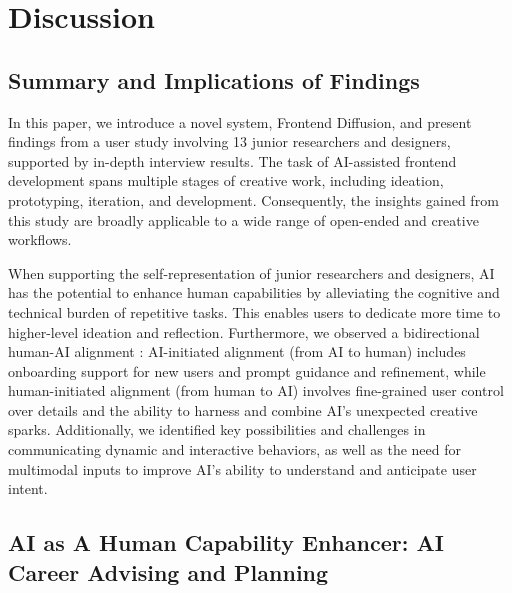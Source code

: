 \section{Discussion}

\subsection{Summary and Implications of Findings}

In this paper, we introduce a novel system, Frontend Diffusion, and present findings from a user study involving 13 junior researchers and designers, supported by in-depth interview results. The task of AI-assisted frontend development spans multiple stages of creative work, including ideation, prototyping, iteration, and development. Consequently, the insights gained from this study are broadly applicable to a wide range of open-ended and creative workflows.

When supporting the self-representation of junior researchers and designers, AI has the potential to enhance human capabilities by alleviating the cognitive and technical burden of repetitive tasks. This enables users to dedicate more time to higher-level ideation and reflection. Furthermore, we observed a bidirectional human-AI alignment \cite{shenBidirectionalHumanAIAlignment2024}: AI-initiated alignment (from AI to human) includes onboarding support for new users and prompt guidance and refinement, while human-initiated alignment (from human to AI) involves fine-grained user control over details and the ability to harness and combine AI's unexpected creative sparks. Additionally, we identified key possibilities and challenges in communicating dynamic and interactive behaviors, as well as the need for multimodal inputs to improve AI's ability to understand and anticipate user intent.

\subsection{AI as A Human Capability Enhancer: AI Career Advising and Planning}
\label{ref:career}

